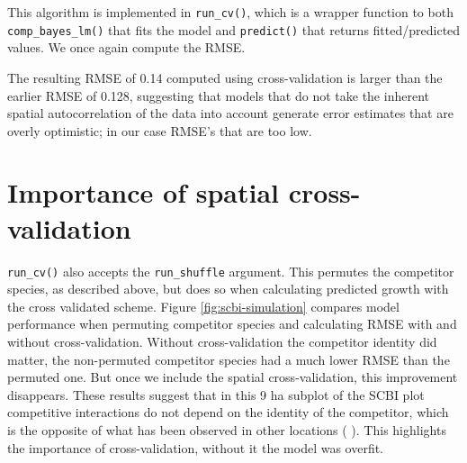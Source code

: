 \documentclass[12pt]{article}
\newenvironment{Shaded}{\begin{snugshade}}{\end{snugshade}}
\newcommand{\CommentTok}[1]{\textcolor[rgb]{0.56,0.35,0.01}{\textit{#1}}}
\newcommand{\DataTypeTok}[1]{\textcolor[rgb]{0.13,0.29,0.53}{#1}}
\newcommand{\KeywordTok}[1]{\textcolor[rgb]{0.13,0.29,0.53}{\textbf{#1}}}
\newcommand{\NormalTok}[1]{#1}
\newcommand{\OperatorTok}[1]{\textcolor[rgb]{0.81,0.36,0.00}{\textbf{#1}}}
\newcommand{\StringTok}[1]{\textcolor[rgb]{0.31,0.60,0.02}{#1}}
\begin{document}
This algorithm is implemented in \texttt{run\_cv()}, which is a wrapper
function to both \texttt{comp\_bayes\_lm()} that fits the model and
\texttt{predict()} that returns fitted/predicted values. We once again
compute the RMSE.

\begin{Shaded}
\end{Shaded}

\begin{Shaded}
\end{Shaded}

The resulting RMSE of 0.14 computed using cross-validation is larger
than the earlier RMSE of 0.128, suggesting that models that do not take
the inherent spatial autocorrelation of the data into account generate
error estimates that are overly optimistic; in our case RMSE's that are
too low.

\hypertarget{importance-of-spatial-cross-validation}{%
\section{Importance of spatial
cross-validation}\label{importance-of-spatial-cross-validation}}

\texttt{run\_cv()} also accepts the \texttt{run\_shuffle} argument. This
permutes the competitor species, as described above, but does so when
calculating predicted growth with the cross validated scheme. Figure
\ref{fig:scbi-simulation} compares model performance when permuting
competitor species and calculating RMSE with and without
cross-validation. Without cross-validation the competitor identity did
matter, the non-permuted competitor species had a much lower RMSE than
the permuted one. But once we include the spatial cross-validation, this
improvement disappears. These results suggest that in this 9 ha subplot
of the SCBI plot competitive interactions do not depend on the identity
of the competitor, which is the opposite of what has been observed in
other locations (\citet{allen_permutation_2020}
\citet{uriarte_spatially_2004}). This highlights the importance of
cross-validation, without it the model was overfit.
\end{document}
